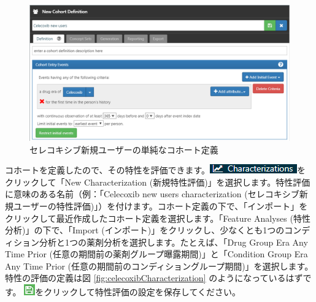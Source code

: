 \documentclass[
  11pt]{book}
\theoremstyle{definition}
\theoremstyle{definition}
\theoremstyle{definition}
\theoremstyle{definition}
\theoremstyle{remark}
\begin{document}
\begin{figure}

{\centering \includegraphics[width=1\linewidth]{images/SuggestedAnswers/celecoxibCohortDefinition} 

}

\caption{セレコキシブ新規ユーザーの単純なコホート定義}\label{fig:celecoxibCohortDefinition}
\end{figure}

コホートを定義したので、その特性を評価できます。\includegraphics{images/Characterization/atlasCharacterizationMenuItem.png}をクリックして「New Characterization (新規特性評価)」を選択します。特性評価に意味のある名前（例：「Celecoxib new users characterization (セレコキシブ新規ユーザーの特性評価)」）を付けます。コホート定義の下で、「インポート」をクリックして最近作成したコホート定義を選択します。「Feature Analyses (特性分析)」の下で、「Import (インポート)」をクリックし、少なくとも1つのコンディション分析と1つの薬剤分析を選択します。たとえば、「Drug Group Era Any Time Prior (任意の期間前の薬剤グループ曝露期間)」と「Condition Group Era Any Time Prior (任意の期間前のコンディショングループ期間)」を選択します。特性の評価の定義は図 \ref{fig:celecoxibCharacterization} のようになっているはずです。 \includegraphics{images/Cohorts/save.png}をクリックして特性評価の設定を保存してください。
\end{document}
